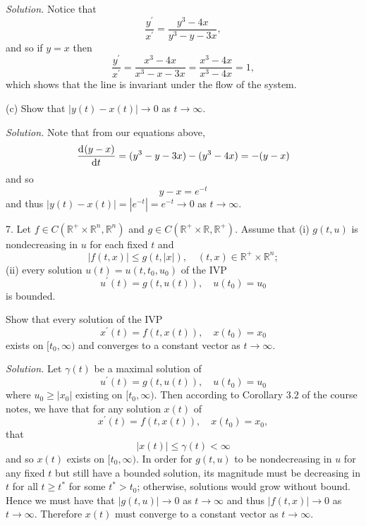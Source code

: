 \documentclass{article}
\newcommand{\R}{\mathbb{R}}
\begin{document}
\textit{Solution.}
Notice that
%
\begin{equation*}
    \frac{y^\prime}{x^\prime} = \frac{y^3 - 4x}{y^3 - y - 3x}
    ,
\end{equation*}
%
and so if $y = x$ then
%
\begin{equation*}
    \frac{y^\prime}{x^\prime} = \frac{x^3 - 4x}{x^3 - x - 3x} = \frac{x^3 - 4x}{x^3 - 4x} = 1
    ,
\end{equation*}
%
which shows that the line is invariant under the flow of the system.

\vspace{5mm}

(c) Show that $|y(t) - x(t)| \to 0$ as $t \to \infty$.

\textit{Solution.}
Note that from our equations above,
%
\begin{equation*}
    \dod{(y - x)}{t} = (y^3 - y - 3x) - (y^3 - 4x) = - (y - x)
\end{equation*}
%
and so
%
\begin{equation*}
    y - x = e^{-t}
\end{equation*}
%
and thus $|y(t) - x(t)| = |e^{-t}| = e^{-t} \to 0$ as $t \to \infty$.

\newpage

7. Let $f \in C(\R^+ \times \R^n, \R^n)$ and $g \in C(\R^+ \times \R, \R^+)$.
Assume that (i) $g(t, u)$ is nondecreasing in $u$ for each fixed $t$ and
%
\begin{equation*}
    |f(t, x)| \leq g(t, |x|), \quad (t, x) \in \R^+ \times \R^n;
\end{equation*}
%
(ii) every solution $u(t) = u(t, t_0, u_0)$ of the IVP
%
\begin{equation*}
    u^\prime(t) = g(t, u(t)), \quad u(t_0) = u_0
\end{equation*}
%
is bounded.

Show that every solution of the IVP
%
\begin{equation*}
    x^\prime(t) = f(t, x(t)), \quad x(t_0) = x_0
\end{equation*}
%
exists on $[t_0, \infty)$ and converges to a constant vector as $t \to \infty$.

\textit{Solution.}
Let $\gamma(t)$ be a maximal solution of
%
\begin{equation*}
    u^\prime(t) = g(t, u(t)), \quad u(t_0) = u_0
\end{equation*}
%
where $u_0 \geq |x_0|$
existing on $[t_0, \infty)$. Then according to Corollary $3.2$ of the course notes,
we have that for any solution $x(t)$ of
%
\begin{equation*}
    x^\prime(t) = f(t, x(t)), \quad x(t_0) = x_0
    ,
\end{equation*}
%
that
%
\begin{equation*}
    |x(t)| \leq \gamma(t) < \infty
\end{equation*}
%
and so $x(t)$ exists on $[t_0, \infty)$. In order for $g(t, u)$ to be nondecreasing in $u$
for any fixed $t$ but still have a bounded solution, its magnitude must be decreasing in $t$ for all
$t \geq t^*$ for some $t^* > t_0$; otherwise, solutions would grow without bound.
Hence we must have that $|g(t, u)| \to 0$ as $t \to \infty$ and thus $|f(t, x)| \to 0$
as $t \to \infty$. Therefore $x(t)$ must converge to a constant vector as $t \to \infty$.
\end{document}
